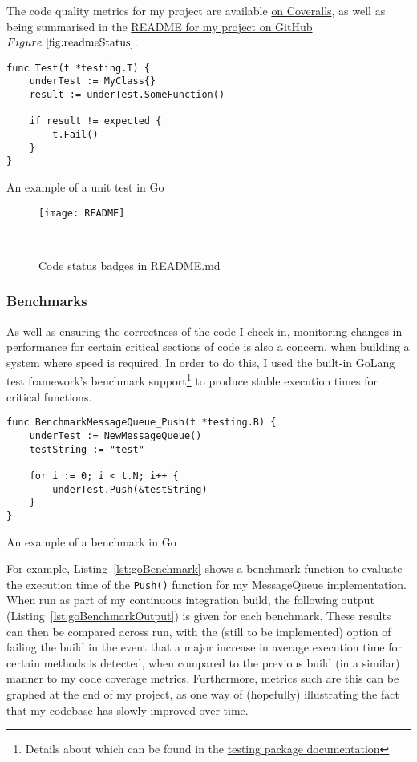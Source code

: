 The code quality metrics for my project are available
\href{https://coveralls.io/github/FireEater64/gamq?branch=master}{on Coveralls},
as well as being summarised in the
\href{https://github.com/FireEater64/gamq/blob/master/README.md}{README for my project on GitHub}\(Figure~\ref{fig:readmeStatus} \).

\begin{listing}
\centering
  \begin{verbatim}
func Test(t *testing.T) {
	underTest := MyClass{}
	result := underTest.SomeFunction()

	if result != expected {
		t.Fail()
	}
}
  \end{verbatim}
  \caption{An example of a unit test in Go}
  \label{lst:goUnitTest}
\end{listing}

\begin{figure}
  \texttt{[image: README]}
  \centering
  \caption{Code status badges in README.md}
  \label{fig:readmeStatus}\
\end{figure}

\subsubsection{Benchmarks}
\label{subs:Benchmarks}

As well as ensuring the correctness of the code I check in, monitoring changes in
performance for certain critical sections of code is also a concern, when building
a system where speed is required. In order to do this, I used the built-in GoLang
test framework's benchmark support\footnote{Details about which can be found in
the \href{https://golang.org/pkg/testing/}{testing package documentation}} to produce
stable execution times for critical functions.

\begin{listing}
  \centering
  \begin{verbatim}
func BenchmarkMessageQueue_Push(t *testing.B) {
	underTest := NewMessageQueue()
	testString := "test"

	for i := 0; i < t.N; i++ {
		underTest.Push(&testString)
	}
}
  \end{verbatim}
  \caption{An example of a benchmark in Go}
  \label{lst:goBenchmark}
\end{listing}

For example,
Listing~\ref{lst:goBenchmark} shows a benchmark function to evaluate the execution time
of the \texttt{Push()} function for my MessageQueue implementation. When
run as part of my continuous integration build, the following output
(Listing~\ref{lst:goBenchmarkOutput}) is given for each benchmark. These results
can then be compared across run, with the (still to be implemented) option of
failing the build in the event that a major increase in average execution time
for certain methods is detected, when compared to the previous build (in a similar)
manner to my code coverage metrics. Furthermore, metrics such are this can be
graphed at the end of my project, as one way of (hopefully) illustrating the
fact that my codebase has slowly improved over time.

